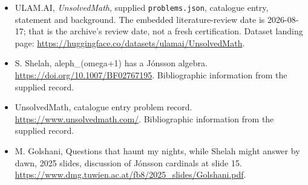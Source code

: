 \documentclass[11pt,a4paper]{article}
\begin{document}
{\small

\begin{itemize}

\item[\hypertarget{source:statement:1}{S1}] ULAM.AI, \emph{UnsolvedMath}, supplied \texttt{problems.json}, catalogue entry, statement and background. The embedded literature-review date is 2026-08-17; that is the archive’s review date, not a fresh certification. Dataset landing page: \url{https://huggingface.co/datasets/ulamai/UnsolvedMath}.

\item[\hypertarget{source:statement:2}{S2}] S. Shelah, aleph\_(omega+1) has a Jónsson algebra. \url{https://doi.org/10.1007/BF02767195}. Bibliographic information from the supplied record.

\item[\hypertarget{source:statement:3}{S3}] UnsolvedMath, catalogue entry problem record. \url{https://www.unsolvedmath.com/}. Bibliographic information from the supplied record.

\item[R1] M. Golshani, Questions that haunt my nights, while Shelah might answer by dawn, 2025 slides, discussion of Jónsson cardinals at slide 15.
\url{https://www.dmg.tuwien.ac.at/fb8/2025_slides/Golshani.pdf}.
\end{itemize}

}

\label{end:statement}
\end{document}
